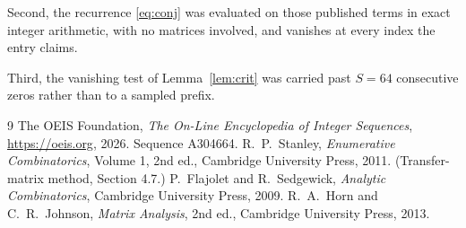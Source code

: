 \documentclass[11pt,a4paper]{article}
\theoremstyle{plain}
\theoremstyle{definition}
\begin{document}
Second, the recurrence \eqref{eq:conj} was evaluated on those published terms in exact
integer arithmetic, with no matrices involved, and vanishes at every index the entry claims.

Third, the vanishing test of Lemma~\ref{lem:crit} was carried past $S=64$ consecutive
zeros rather than to a sampled prefix.

\begin{thebibliography}{9}
 The OEIS Foundation, \emph{The On-Line Encyclopedia of Integer
Sequences}, \url{https://oeis.org}, 2026. Sequence A304664.
 R.~P.~Stanley, \emph{Enumerative Combinatorics}, Volume 1, 2nd ed.,
Cambridge University Press, 2011. (Transfer-matrix method, Section 4.7.)
 P.~Flajolet and R.~Sedgewick, \emph{Analytic Combinatorics}, Cambridge
University Press, 2009.
 R.~A.~Horn and C.~R.~Johnson, \emph{Matrix Analysis}, 2nd ed., Cambridge
University Press, 2013.
\end{thebibliography}
\end{document}
